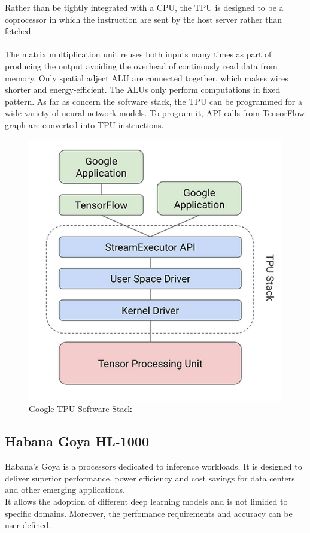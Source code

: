 Rather than be tightly integrated with a CPU, the TPU is designed to be a coprocessor in which the instruction are sent by the host server rather than fetched.\\\\
The matrix multiplication unit reuses both inputs many times as part of producing the output avoiding the overhead of continously read data from memory. Only spatial adject ALU are connected together, which makes wires shorter and energy-efficient. The ALUs only perform computations in fixed pattern. 
\newpage
As far as concern the software stack, the TPU can be programmed for a wide variety of neural network models. To program it, API calls from TensorFlow graph are converted into TPU instructions.
\begin{figure}[H] 
\centering
\captionsetup{justification=centering}
  \includegraphics[scale=0.4]{./figure/tpu_sw_stack.PNG}
\caption{Google TPU Software Stack}
  \label{fig:gtpuswstack}
\end{figure} 
	
\subsection{Habana Goya HL-1000}

Habana’s Goya is a processors dedicated to inference workloads. It is designed to deliver superior performance, power efficiency and cost savings for data centers and other emerging applications.\\
It allows the adoption of different deep learning models and is not limided to specific domains. Moreover, the perfomance requirements and accuracy can be user-defined.\\

